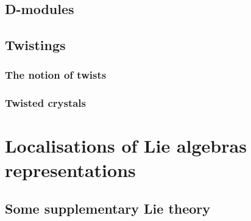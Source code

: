         \subsection{D-modules}
        
        \subsection{Twistings}
            \subsubsection{The notion of twists}
            
            \subsubsection{Twisted crystals}
    
    \section{Localisations of Lie algebras representations}
        \subsection{Some supplementary Lie theory}

